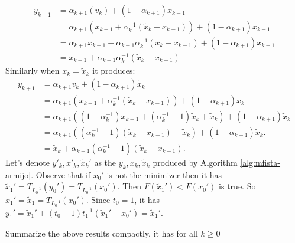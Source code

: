 \documentclass[12pt]{report}
\begin{document}
\begin{example}
\begin{align*}
                y_{k + 1} &= \alpha_{k + 1}(v_k) + (1 - \alpha_{k + 1})x_{k - 1}
                \\
                &= \alpha_{k + 1}(x_{k - 1} + \alpha_k^{-1}(\tilde x_k - x_{k - 1})) + (1 - \alpha_{k + 1})x_{k - 1}
                \\
                &= \alpha_{k + 1} x_{k - 1} + \alpha_{k + 1}\alpha_k^{-1}(\tilde x_k - x_{k - 1}) + (1 - \alpha_{k + 1}) x_{k - 1}
                \\
                &= x_{k - 1} + \alpha_{k + 1}\alpha_k^{-1}(\tilde x_k - x_{k - 1})
            \end{align*}
            Similarly when $x_k = \tilde x_k$ it produces: 
            \begin{align*}
                y_{k + 1} &= 
                \alpha_{k + 1}v_k + (1 - \alpha_{k + 1})\tilde x_k
                \\
                &= 
                \alpha_{k + 1}(x_{k - 1} + \alpha_k^{-1}(\tilde x_k - x_{k - 1})) + (1 - \alpha_{k + 1})x_k
                \\
                &= 
                \alpha_{k + 1}\left(
                    (1 - \alpha_{k}^{-1})x_{k - 1} + (\alpha_k^{-1} - 1)\tilde x_k + \tilde x_k
                \right) + 
                (1 - \alpha_{k + 1})\tilde x_k
                \\
                &= 
                \alpha_{k + 1}\left(
                    (\alpha_k^{-1} - 1)(\tilde x_k - x_{k - 1}) + \tilde x_k
                \right) + 
                (1 - \alpha_{k + 1})\tilde x_k. 
                \\
                &= \tilde x_k + \alpha_{k + 1}(\alpha_k^{-1} - 1)(\tilde x_k - x_{k - 1}). 
            \end{align*}
            Let's denote $y'_{k}, x'_{k}, \tilde x_k'$ as the $y_k, x_k, \tilde x_k$ produced by Algorithm \ref{alg:mfista-armijo}.
            Observe that if $x_0'$ is not the minimizer then it has $\tilde x_1' = T_{L_0^{-1}}(y_0') = T_{L_0^{-1}}(x_0')$. 
            Then $F(\tilde x_1') < F(x_0')$ is true. 
            So $x_1' = \tilde x_1 = T_{L_0^{-1}}(x_0')$. 
            Since $t_0 = 1$, it has $y_1' =\tilde x_1' + (t_0 - 1)t_1^{-1}(\tilde x_1' - x_0')= \tilde x_1'$. 
            \par
            Summarize the above results compactly, it has for all $k \ge 0$

\end{example}
\end{document}
